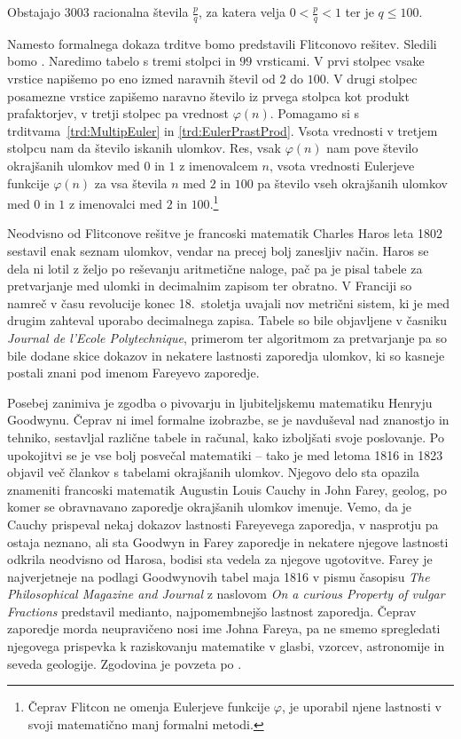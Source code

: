 \documentclass[mat1]{fmfdelo}
\begin{document}
\begin{trditev}
Obstajajo $3003$ racionalna števila $\frac{p}{q}$, za katera velja $0<\frac{p}{q}<1$ ter je $q \leq 100$.
\end{trditev}

Namesto formalnega dokaza trditve bomo predstavili Flitconovo rešitev. Sledili bomo \cite[poglavje 1.2]{fareyproject}. Naredimo tabelo s tremi stolpci in $99$ vrsticami. V prvi stolpec vsake vrstice napišemo po eno izmed naravnih števil od $2$ do $100$. V drugi stolpec posamezne vrstice zapišemo naravno število iz prvega stolpca kot produkt prafaktorjev, v tretji stolpec pa vrednost $\varphi(n)$. Pomagamo si s trditvama~\ref{trd:MultipEuler} in \ref{trd:EulerPrastProd}. Vsota vrednosti v tretjem stolpcu nam da število iskanih ulomkov. Res, vsak $\varphi(n)$ nam pove število okrajšanih ulomkov med $0$ in $1$ z imenovalcem $n$, vsota vrednosti Eulerjeve funkcije $\varphi(n)$ za vsa števila $n$ med $2$ in $100$ pa število vseh okrajšanih ulomkov med $0$ in $1$ z imenovalci med $2$ in $100$.\footnote{Čeprav Flitcon ne omenja Eulerjeve funkcije $\varphi$, je uporabil njene lastnosti v svoji matematično manj formalni metodi.}

Neodvisno od Flitconove rešitve je francoski matematik Charles Haros leta 1802 sestavil enak seznam ulomkov, vendar na precej bolj zanesljiv način. Haros se dela ni lotil z željo po reševanju aritmetične naloge, pač pa je pisal tabele za pretvarjanje med ulomki in decimalnim zapisom ter obratno. V Franciji so namreč v času revolucije konec 18.~stoletja uvajali nov metrični sistem, ki je med drugim zahteval uporabo decimalnega zapisa. Tabele so bile objavljene v časniku \emph{Journal de l'Ecole Polytechnique}, primerom ter algoritmom za pretvarjanje pa so bile dodane skice dokazov in nekatere lastnosti zaporedja ulomkov, ki so kasneje postali znani pod imenom Fareyevo zaporedje. 

Posebej zanimiva je zgodba o pivovarju in ljubiteljskemu matematiku Henryju Goodwynu. Čeprav ni imel formalne izobrazbe, se je navduševal nad znanostjo in tehniko, sestavljal različne tabele in računal, kako izboljšati svoje poslovanje. Po upokojitvi se je vse bolj posvečal matematiki -- tako je med letoma 1816 in 1823 objavil več člankov s tabelami okrajšanih ulomkov. Njegovo delo sta opazila znameniti francoski matematik Augustin Louis Cauchy in John Farey, geolog, po komer se obravnavano zaporedje okrajšanih ulomkov imenuje. Vemo, da je Cauchy prispeval nekaj dokazov lastnosti Fareyevega zaporedja, v nasprotju pa ostaja neznano, ali sta Goodwyn in Farey zaporedje in nekatere njegove lastnosti odkrila neodvisno od Harosa, bodisi sta vedela za njegove ugotovitve. Farey je najverjetneje na podlagi Goodwynovih tabel maja 1816 v pismu časopisu \emph{The Philosophical Magazine and Journal} z naslovom \emph{On a curious Property of vulgar Fractions} predstavil medianto, najpomembnejšo lastnost zaporedja. Čeprav zaporedje morda neupravičeno nosi ime Johna Fareya, pa ne smemo spregledati njegovega prispevka k raziskovanju matematike v glasbi, vzorcev, astronomije in seveda geologije. Zgodovina je povzeta po \cite[poglavje 2]{motifofmath}.
\end{document}
